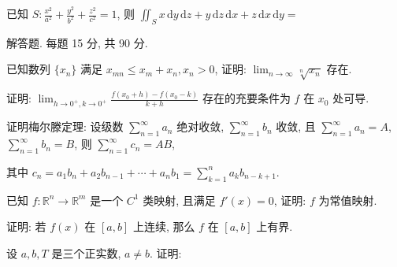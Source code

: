 已知 $S: \frac{x^2}{a^2} + \frac{y^2}{b^2} + \frac{z^2}{c^2} = 1$, 则 $\iint_{S} x \, \mathrm{d}y \, \mathrm{d}z + y \, \mathrm{d}z \, \mathrm{d}x + z \, \mathrm{d}x \, \mathrm{d}y =$\par
\par{}
解答题. 每题 15 分, 共 90 分.\par
已知数列 $\{x_{n}\}$ 满足 $x_{mn} \leq x_{m} + x_{n}, x_{n} > 0$, 证明: $\lim_{n \to \infty} \sqrt[n]{x_n}$ 存在.\par
证明: $\lim_{h \to 0^{+}, k \to 0^{+}} \frac{f(x_0 + h) - f(x_0 - k)}{k + h}$ 存在的充要条件为 $f$ 在 $x_0$ 处可导.\par
证明梅尔滕定理: 设级数 $\sum_{n=1}^{\infty} a_n$ 绝对收敛, $\sum_{n=1}^{\infty} b_n$ 收敛, 且 $\sum_{n=1}^{\infty} a_n = A$, $\sum_{n=1}^{\infty} b_n = B$, 则 $\sum_{n=1}^{\infty} c_n = AB$,\par
其中  $c_{n}=a_{1}b_{n}+a_{2}b_{n-1}+\cdots+a_{n}b_{1}=\sum_{k=1}^{n}a_{k}b_{n-k+1}.$\par
已知 $f: \mathbb{R}^n \to \mathbb{R}^m$ 是一个 $C^1$ 类映射, 且满足 $f'(x) = 0$, 证明: $f$ 为常值映射.\par
证明: 若 $f(x)$ 在 $[a, b]$ 上连续, 那么 $f$ 在 $[a, b]$ 上有界.\par
\par{}
设 $a, b, T$ 是三个正实数, $a \neq b$. 证明:\par
\nopagebreak[4]
